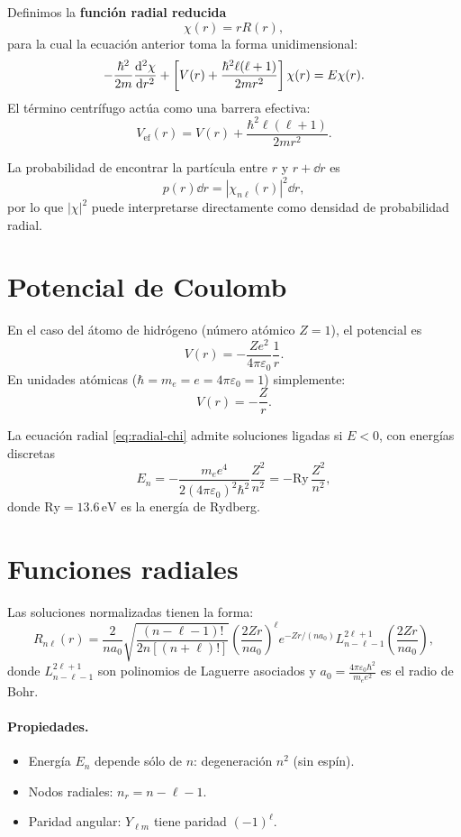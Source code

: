 \documentclass[11pt]{article}
\begin{document}
Definimos la \textbf{función radial reducida}
\[
\chi(r) = rR(r),
\]
para la cual la ecuación anterior toma la forma unidimensional:
\begin{equation}
-\frac{\hbar^2}{2m}\dv[2]{\chi}{r}
+ \left[V(r)+\frac{\hbar^2\ell(\ell+1)}{2mr^2}\right]\chi(r)=E\chi(r).
\label{eq:radial-chi}
\end{equation}
El término centrífugo actúa como una barrera efectiva:
\[
V_{\text{ef}}(r) = V(r) + \frac{\hbar^2\ell(\ell+1)}{2mr^2}.
\]

La probabilidad de encontrar la partícula entre \(r\) y \(r+\dd r\) es
\[
p(r)\dd r = |\chi_{n\ell}(r)|^2\dd r,
\]
por lo que \(|\chi|^2\) puede interpretarse directamente como densidad de probabilidad radial.

\section{Potencial de Coulomb}
\label{sec:coulomb}

En el caso del átomo de hidrógeno (número atómico \(Z=1\)), el potencial es
\[
V(r) = -\frac{Ze^2}{4\pi\varepsilon_0}\frac{1}{r}.
\]
En unidades atómicas (\(\hbar = m_e = e = 4\pi\varepsilon_0 = 1\)) simplemente:
\[
V(r) = -\frac{Z}{r}.
\]

La ecuación radial \eqref{eq:radial-chi} admite soluciones ligadas si \(E<0\),
con energías discretas
\begin{equation}
E_n = -\frac{m_e e^4}{2(4\pi\varepsilon_0)^2\hbar^2}\frac{Z^2}{n^2}
= -\mathrm{Ry}\,\frac{Z^2}{n^2},
\label{eq:energy}
\end{equation}
donde \(\mathrm{Ry}=13.6\,\text{eV}\) es la energía de Rydberg.

\section{Funciones radiales}
\label{sec:radial-funcs}

Las soluciones normalizadas tienen la forma:
\begin{equation}
R_{n\ell}(r) =
\frac{2}{n a_0}
\sqrt{\frac{(n-\ell-1)!}{2n[(n+\ell)!]}}
\left(\frac{2Zr}{n a_0}\right)^\ell
e^{-Zr/(n a_0)}
L^{2\ell+1}_{n-\ell-1}\!\left(\frac{2Zr}{n a_0}\right),
\label{eq:Rnl}
\end{equation}
donde \(L^{2\ell+1}_{n-\ell-1}\) son polinomios de Laguerre asociados y
\(a_0=\frac{4\pi\varepsilon_0\hbar^2}{m_e e^2}\) es el radio de Bohr.

\paragraph{Propiedades.}
\begin{itemize}
\item Energía \(E_n\) depende sólo de \(n\): degeneración \(n^2\) (sin espín).
\item Nodos radiales: \(n_r = n - \ell - 1\).
\item Paridad angular: \(Y_{\ell m}\) tiene paridad \((-1)^\ell\).
\end{itemize}
\end{document}

